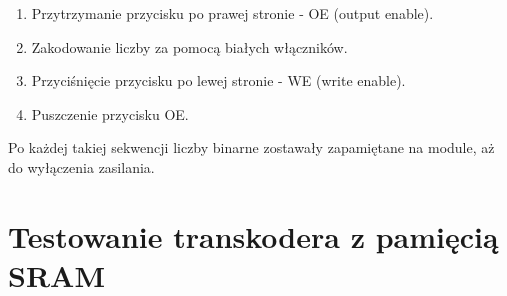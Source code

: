 \begin{itemize}
\begin{enumerate}
            \item Przytrzymanie przycisku po prawej stronie - OE (output enable).
            \item Zakodowanie liczby za pomocą białych włączników.
            \item Przyciśnięcie przycisku po lewej stronie - WE (write enable).
            \item Puszczenie przycisku OE.
        \end{enumerate}
        Po każdej takiej sekwencji liczby binarne zostawały zapamiętane na module, aż do wyłączenia zasilania.
\end{itemize}

\pagebreak

\section{Testowanie transkodera z pamięcią SRAM}


